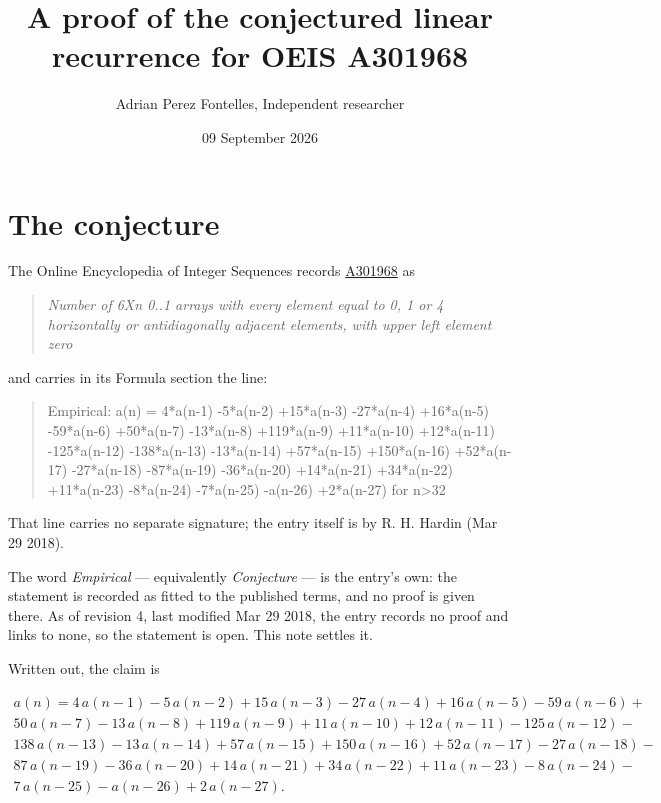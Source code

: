 \documentclass[11pt]{article}
\title{A proof of the conjectured linear recurrence for OEIS A301968}
\author{Adrian Perez Fontelles, Independent researcher}
\date{09 September 2026}
\theoremstyle{definition}
\begin{document}
\maketitle
\section{The conjecture}

The Online Encyclopedia of Integer Sequences records \href{https://oeis.org/A301968}{A301968} as

\begin{quote}\itshape Number of 6Xn 0..1 arrays with every element equal to 0, 1 or 4 horizontally or antidiagonally adjacent elements, with upper left element zero\end{quote}

and carries in its Formula section the line:

\begin{quote}\ttfamily Empirical: a(n) = 4*a(n-1) -5*a(n-2) +15*a(n-3) -27*a(n-4) +16*a(n-5) -59*a(n-6) +50*a(n-7) -13*a(n-8) +119*a(n-9) +11*a(n-10) +12*a(n-11) -125*a(n-12) -138*a(n-13) -13*a(n-14) +57*a(n-15) +150*a(n-16) +52*a(n-17) -27*a(n-18) -87*a(n-19) -36*a(n-20) +14*a(n-21) +34*a(n-22) +11*a(n-23) -8*a(n-24) -7*a(n-25) -a(n-26) +2*a(n-27) for n>32\end{quote}

That line carries no separate signature; the entry itself is by R. H. Hardin (Mar 29 2018).

The word {\itshape Empirical} --- equivalently {\itshape Conjecture} --- is the entry's own: the statement is recorded as fitted to the published terms, and no proof is given there. As of revision 4, last modified Mar 29 2018, the entry records no proof and links to none, so the statement is open. This note settles it.

Written out, the claim is

\begin{multline*} a(n) = 4\,a(n-1) - 5\,a(n-2) + 15\,a(n-3) - 27\,a(n-4) + 16\,a(n-5) - 59\,a(n-6) + \\ 50\,a(n-7) - 13\,a(n-8) + 119\,a(n-9) + 11\,a(n-10) + 12\,a(n-11) - 125\,a(n-12) - \\ 138\,a(n-13) - 13\,a(n-14) + 57\,a(n-15) + 150\,a(n-16) + 52\,a(n-17) - 27\,a(n-18) - \\ 87\,a(n-19) - 36\,a(n-20) + 14\,a(n-21) + 34\,a(n-22) + 11\,a(n-23) - 8\,a(n-24) - \\ 7\,a(n-25) - a(n-26) + 2\,a(n-27). \end{multline*}
\end{document}
